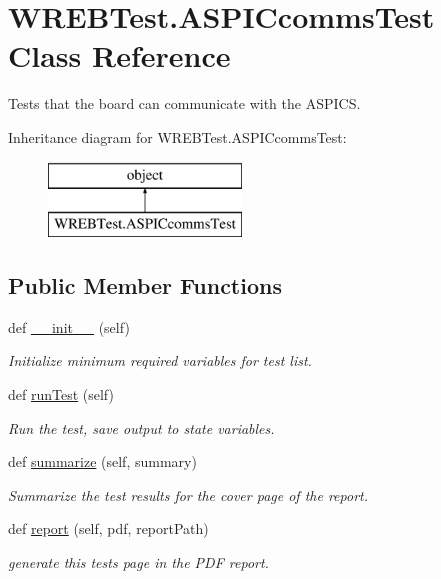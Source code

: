 \hypertarget{class_w_r_e_b_test_1_1_a_s_p_i_ccomms_test}{}\section{W\+R\+E\+B\+Test.\+A\+S\+P\+I\+Ccomms\+Test Class Reference}
\label{class_w_r_e_b_test_1_1_a_s_p_i_ccomms_test}


Tests that the board can communicate with the A\+S\+P\+I\+CS.  


Inheritance diagram for W\+R\+E\+B\+Test.\+A\+S\+P\+I\+Ccomms\+Test\+:\begin{figure}[H]
\begin{center}
\leavevmode
\includegraphics[height=2.000000cm]{class_w_r_e_b_test_1_1_a_s_p_i_ccomms_test}
\end{center}
\end{figure}
\subsection*{Public Member Functions}
\begin{DoxyCompactItemize}
\item 
def \hyperlink{class_w_r_e_b_test_1_1_a_s_p_i_ccomms_test_accfa18c4f22917c2d1ed89b083f02615}{\+\_\+\+\_\+init\+\_\+\+\_\+} (self)
\begin{DoxyCompactList}\small\item\em Initialize minimum required variables for test list. \end{DoxyCompactList}\item 
def \hyperlink{class_w_r_e_b_test_1_1_a_s_p_i_ccomms_test_ab1d5e43e09a6ba9656a27631614cd268}{run\+Test} (self)
\begin{DoxyCompactList}\small\item\em Run the test, save output to state variables. \end{DoxyCompactList}\item 
def \hyperlink{class_w_r_e_b_test_1_1_a_s_p_i_ccomms_test_a359865f04f303787eb68e5f29409a768}{summarize} (self, summary)
\begin{DoxyCompactList}\small\item\em Summarize the test results for the cover page of the report. \end{DoxyCompactList}\item 
def \hyperlink{class_w_r_e_b_test_1_1_a_s_p_i_ccomms_test_a22d5544b8f7c5d9373b9804bb716cc40}{report} (self, pdf, report\+Path)
\begin{DoxyCompactList}\small\item\em generate this test\textquotesingle{}s page in the P\+DF report. \end{DoxyCompactList}\end{DoxyCompactItemize}


